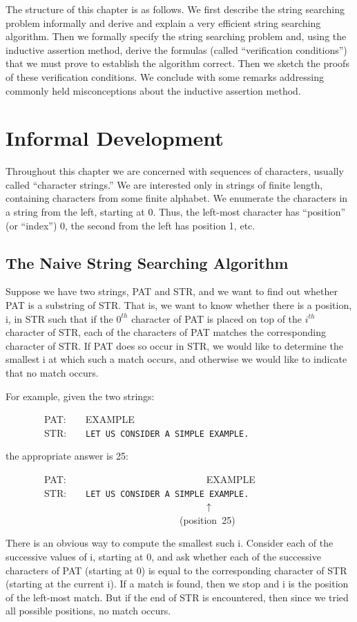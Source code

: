\documentclass[11pt]{book}
\newenvironment{pubasis}{\begin{flushleft}\ttfamily\small}{\normalsize\rmfamily\end{flushleft}}
\newcommand{\pubdefaulttextsize}{\large}
\begin{document}
The structure of this chapter is as follows.
We first describe the string searching problem informally and
derive and explain a very efficient string searching algorithm.
Then we formally specify the string searching problem and, using the
inductive assertion method, derive the formulas (called ``verification
conditions'') that we must prove to establish the algorithm
correct.  Then we sketch the proofs of these verification
conditions.  We conclude with some remarks addressing commonly held
misconceptions about the inductive assertion method.
\section{Informal Development}
\label{SSFSTRPOSEXAMPLE}
\pubdefaulttextsize
Throughout this chapter we are concerned with sequences
of characters, usually called ``character strings.''  We are
interested only in strings of finite length, containing characters from some
finite alphabet.  We  enumerate the characters in a string from the
left, starting at 0.  Thus, the left-most character has ``position'' (or ``index'')
0, the second from the left has position 1, etc.
\subsection{The Naive String Searching Algorithm}
\pubdefaulttextsize
Suppose we have two strings, PAT and STR, and we want to find out
whether PAT is a substring of STR.  That is, we want to know whether
there is a position, i, in STR such that if the $0^{th}$ character of PAT
is placed on top of the $i^{th}$ character of STR, each of the
characters of PAT matches the corresponding character of STR.
If PAT does so occur in STR, we would like to determine the smallest
i at which such a match occurs, and otherwise we would like to indicate
that no match occurs.

For example, given the two strings:
\begin{pubasis}
~~~~~~~~PAT:~~~~EXAMPLE\\
~~~~~~~~STR:~~~~\verb*+LET US CONSIDER A SIMPLE EXAMPLE.+\\
\end{pubasis}
the appropriate answer is 25:
\begin{pubasis}
~~~~~~~~PAT:~~~~~~~~~~~~~~~~~~~~~~~~~~~~~EXAMPLE\\
~~~~~~~~STR:~~~~\verb*+LET US CONSIDER A SIMPLE EXAMPLE.+\\
~~~~~~~~~~~~~~~~~~~~~~~~~~~~~~~~~~~~~~~~~$\uparrow$\\
~~~~~~~~~~~~~~~~~~~~~~~~~~~~~~~~~~~~(position~25)\\
\end{pubasis}
There is an obvious way to compute the smallest such i.  Consider each
of the successive values of i, starting at 0, and ask whether
each of the successive characters of PAT (starting at 0) is equal
to the corresponding character of STR (starting at the current i).
If a match is found, then we stop and i is the position of the left-most match.
But if the end of STR is encountered, then
since we tried all possible positions, no match occurs.
\end{document}
